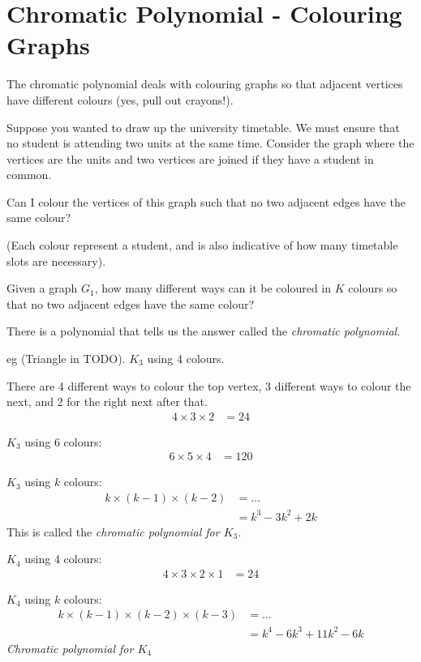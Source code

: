 
\section{Chromatic Polynomial - Colouring Graphs}
\label{sec:ColouringGraphs}
The chromatic polynomial deals with colouring graphs so that adjacent vertices
have different colours (yes, pull out crayons!).

Suppose you wanted to draw up the university timetable. We must ensure that no
student is attending two units at the same time. Consider the graph where the
vertices are the units and two vertices are joined if they have a student in
common.

Can I colour the vertices of this graph such that no two adjacent edges have
the same colour?

(Each colour represent a student, and is also indicative of how many
timetable slots are necessary).

Given a graph $G_1$, how many different ways can it be coloured in $K$ colours
so that no two adjacent edges have the same colour?

There is a polynomial that tells us the answer called the \emph{chromatic
polynomial}.

eg (Triangle in TODO). 
$K_3$ using 4 colours.

There are 4 different ways to colour the top vertex, 3 different ways to
colour the next, and 2 for the right next after that.
\begin{align}
  4 \times 3 \times 2 & = 24
\end{align}

$K_3$ using 6 colours: 
\begin{align}
  6 \times 5 \times 4 & = 120
\end{align}

$K_3$ using $k$ colours:
\begin{align}
  k \times (k-1) \times (k-2) & = \ldots \\
  & = k^{3} - 3k^{2} + 2k
\end{align}
This is called the \emph{chromatic polynomial for $K_3$}.

$K_4$ using 4 colours:
\begin{align}
  4 \times 3 \times 2 \times 1 & = 24
\end{align}

$K_4$ using $k$ colours:
\begin{align}
  k \times (k-1) \times (k-2) \times (k-3) & = \ldots \\
  & = k^{4} - 6k^{3} + 11k^{2} - 6k
\end{align}
\emph{Chromatic polynomial for $K_4$}

